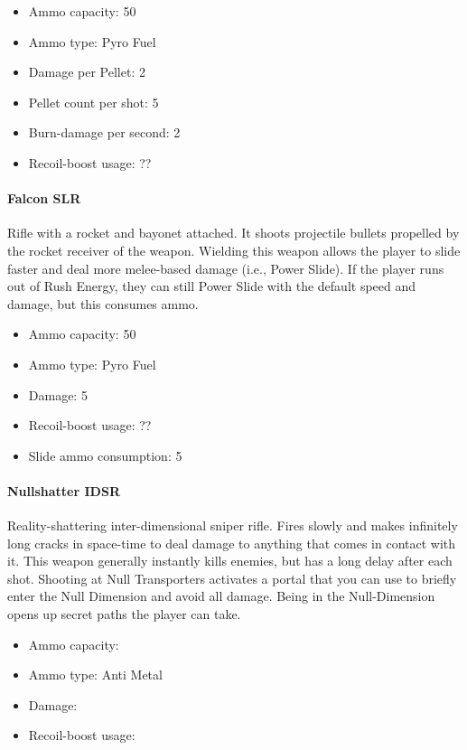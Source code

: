 \documentclass[12pt]{article}
\begin{document}
\begin{itemize}
	\item Ammo capacity: 50
	\item Ammo type: Pyro Fuel
	\item Damage per Pellet: 2
	\item Pellet count per shot: 5
	\item Burn-damage per second: 2
	\item Recoil-boost usage: ??
\end{itemize} 

\paragraph{Falcon SLR}

Rifle with a rocket and bayonet attached. It shoots projectile bullets propelled by the rocket receiver of the weapon. Wielding this weapon allows the player to slide faster and deal more melee-based damage (i.e., Power Slide). If the player runs out of Rush Energy, they can still Power Slide with the default speed and damage, but this consumes ammo. 

\begin{itemize}
	\item Ammo capacity: 50
	\item Ammo type: Pyro Fuel
	\item Damage: 5
	\item Recoil-boost usage: ??
	\item Slide ammo consumption: 5
\end{itemize} 


\paragraph{Nullshatter IDSR}

Reality-shattering inter-dimensional sniper rifle. Fires slowly and makes infinitely long cracks in space-time to deal damage to anything that comes in contact with it. This weapon generally instantly kills enemies, but has a long delay after each shot. Shooting at Null Transporters activates a portal that you can use to briefly enter the Null Dimension and avoid all damage. Being in the Null-Dimension opens up secret paths the player can take.

\begin{itemize}
	\item Ammo capacity: 
	\item Ammo type: Anti Metal
	\item Damage: 
	\item Recoil-boost usage:
\end{itemize}
\end{document}
